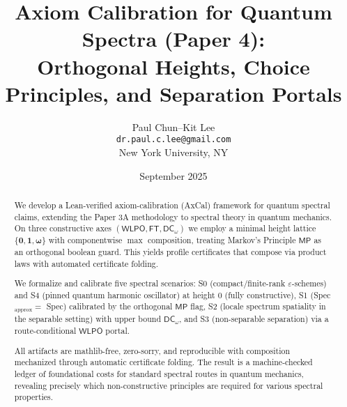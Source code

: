 \documentclass[11pt]{article}
\title{Axiom Calibration for Quantum Spectra (Paper 4):\\
Orthogonal Heights, Choice Principles, and Separation Portals}
\author{Paul Chun--Kit Lee\\
\texttt{dr.paul.c.lee@gmail.com}\\
New York University, NY}
\date{September 2025}
\newcommand{\WLPO}{\mathsf{WLPO}}
\newcommand{\FT}{\mathsf{FT}}
\newcommand{\DCw}{\mathsf{DC}_{\omega}}
\newcommand{\MP}{\mathsf{MP}}
\newcommand{\hzero}{\mathbf{0}}
\newcommand{\hone}{\mathbf{1}}
\newcommand{\homega}{\boldsymbol{\omega}}
\theoremstyle{plain}
\theoremstyle{definition}
\theoremstyle{remark}
\begin{document}
\maketitle

\begin{abstract}
We develop a Lean-verified axiom-calibration (AxCal) framework for quantum spectral claims, extending the Paper 3A methodology to spectral theory in quantum mechanics.
On three constructive axes \((\WLPO,\FT,\DCw)\) we employ a minimal height lattice
\(\{\hzero,\hone,\homega\}\) with componentwise \(\max\) composition, treating Markov's Principle \(\MP\) as an
orthogonal boolean guard. This yields profile certificates that compose via product
laws with automated certificate folding. 

We formalize and calibrate five spectral scenarios:
S0 (compact/finite-rank \(\varepsilon\)-schemes) and S4 (pinned quantum harmonic oscillator) at height \(0\) (fully constructive),
S1 (Spec\(_{\mathrm{approx}}=\) Spec) calibrated by the orthogonal \(\MP\) flag, 
S2 (locale spectrum spatiality in the separable setting) with upper bound \(\DCw\), 
and S3 (non-separable separation) via a route-conditional \(\WLPO\) portal. 

All artifacts are mathlib-free, zero-sorry, and reproducible with composition mechanized through automatic certificate folding. The result
is a machine-checked ledger of foundational costs for standard spectral routes in quantum mechanics,
revealing precisely which non-constructive principles are required for various spectral properties.
\end{abstract}

\tableofcontents

\noindent{}
\end{document}
